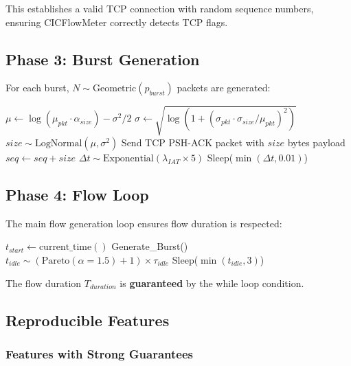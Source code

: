\documentclass[11pt,a4paper]{article}
\begin{document}
This establishes a valid TCP connection with random sequence numbers, ensuring CICFlowMeter correctly detects TCP flags.

\subsection{Phase 3: Burst Generation}

For each burst, $N \sim \text{Geometric}(p_{burst})$ packets are generated:

\begin{algorithm}[H]
\caption{Burst Generation}
\begin{algorithmic}
    \STATE $\mu \leftarrow \log(\mu_{pkt} \cdot \alpha_{size}) - \sigma^2/2$
    \STATE $\sigma \leftarrow \sqrt{\log(1 + (\sigma_{pkt} \cdot \sigma_{size} / \mu_{pkt})^2)}$
    \STATE $size \sim \text{LogNormal}(\mu, \sigma^2)$
    \STATE Send TCP PSH-ACK packet with $size$ bytes payload
    \STATE $seq \leftarrow seq + size$
    \STATE $\Delta t \sim \text{Exponential}(\lambda_{IAT} \times 5)$
    \STATE Sleep($\min(\Delta t, 0.01)$)
\ENDFOR
\end{algorithmic}
\end{algorithm}

\subsection{Phase 4: Flow Loop}

The main flow generation loop ensures flow duration is respected:

\begin{algorithm}[H]
\caption{Flow Generation}
\begin{algorithmic}
\STATE $t_{start} \leftarrow \text{current\_time}()$
    \STATE Generate\_Burst()
    \STATE $t_{idle} \sim (\text{Pareto}(\alpha=1.5) + 1) \times \tau_{idle}$
    \STATE Sleep($\min(t_{idle}, 3)$)
\ENDWHILE
\end{algorithmic}
\end{algorithm}

The flow duration $T_{duration}$ is \textbf{guaranteed} by the while loop condition.

\subsection{Reproducible Features}

\subsubsection{Features with Strong Guarantees}
\end{document}
